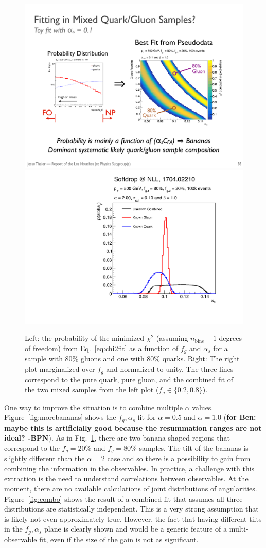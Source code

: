 \begin{figure}[h!]
\begin{center}
\includegraphics[width = 0.49\columnwidth]{figures/banana.pdf}\includegraphics[width = 0.42\columnwidth]{figures/palpha_alpha_2_0beta_1_0_zcut_0_100.pdf}
\end{center}
\caption{Left: the probability of the minimized $\chi^2$ (assuming $n_\text{bins}-1$ degrees of freedom) from Eq.~\ref{eq:chi2fit} as a function of $f_g$ and $\alpha_s$ for a sample with 80\% gluons and one with 80\% quarks.  Right: The right plot marginalized over $f_g$ and normalized to unity.  The three lines correspond to the pure quark, pure gluon, and the combined fit of the two mixed samples from the left plot ($f_g\in\{0.2,0.8\}$).}
\label{fig:alpha2fit}
\end{figure}

One way to improve the situation is to combine multiple $\alpha$ values.  Figure~\ref{fig:morebananas} shows the $f_g,\alpha_s$ fit for $\alpha = 0.5$ and $\alpha=1.0$ (\textbf{for Ben: maybe this is artificially good because the resummation ranges are not ideal? -BPN}).  As in Fig.~\ref{fig:alpha2fit}, there are two banana-shaped regions that correspond to the $f_g=20\%$ and $f_g=80\%$ samples.   The tilt of the bananas is slightly different than the $\alpha=2$ case and so there is a possibility to gain from combining the information in the observables.  In practice, a challenge with this extraction is the need to understand correlations between observables.  At the moment, there are no available calculations of joint distributions of angularities.  Figure~\ref{fig:combo} shows the result of a combined fit that assumes all three distributions are statistically independent.  This is a very strong assumption that is likely not even approximately true.  However, the fact that having different tilts in the $f_g,\alpha_s$ plane is clearly shown and would be a generic feature of a multi-observable fit, even if the size of the gain is not as significant. 

